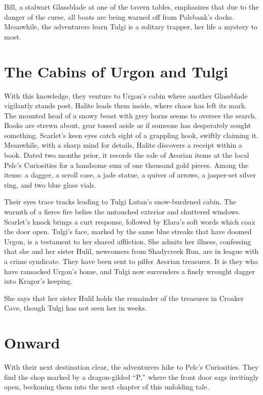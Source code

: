 \documentclass[
  letterpaper,12pt,twoside,twocolumn,openany,
  nodeprecatedcode,bg=full]{dndbook}
\begin{document}
Bill, a stalwart Glassblade at one of the tavern tables, emphasizes that
due to the danger of the curse, all boats are being warned off from
Palebank's docks. Meanwhile, the adventurers learn Tulgi is a solitary
trapper, her life a mystery to most.

\section{The Cabins of Urgon and
Tulgi}\label{the-cabins-of-urgon-and-tulgi}

With this knowledge, they venture to Urgon's cabin where another
Glassblade vigilantly stands post. Halite leads them inside, where chaos
has left its mark. The mounted head of a snowy beast with grey horns
seems to oversee the search. Books are strewn about, gear tossed aside
as if someone has desperately sought something. Scarlet's keen eyes
catch sight of a grappling hook, swiftly claiming it. Meanwhile, with a
sharp mind for details, Halite discovers a receipt within a book. Dated
two months prior, it records the sale of Aeorian items at the local
Pelc's Curiosities for a handsome sum of one thousand gold pieces. Among
the items: a dagger, a scroll case, a jade statue, a quiver of arrows, a
jasper-set silver ring, and two blue glass vials.

Their eyes trace tracks leading to Tulgi Lutan's snow-burdened cabin.
The warmth of a fierce fire belies the untouched exterior and shuttered
windows. Scarlet's knock brings a curt response, followed by Elara's
soft words which coax the door open. Tulgi's face, marked by the same
blue streaks that have doomed Urgon, is a testament to her shared
affliction. She admits her illness, confessing that she and her sister
Hulil, newcomers from Shadycreek Run, are in league with a crime
syndicate. They have been sent to pilfer Aeorian treasures. It is they
who have ransacked Urgon's home, and Tulgi now surrenders a finely
wrought dagger into Kragor's keeping.

She says that her sister Hulil holds the remainder of the treasures in
Croaker Cave, though Tulgi has not seen her in weeks.

\section{Onward}\label{onward}

With their next destination clear, the adventurers hike to Pelc's
Curiosities. They find the shop marked by a dragon-gilded ``P,'' where
the front door sags invitingly open, beckoning them into the next
chapter of this unfolding tale.
\end{document}
